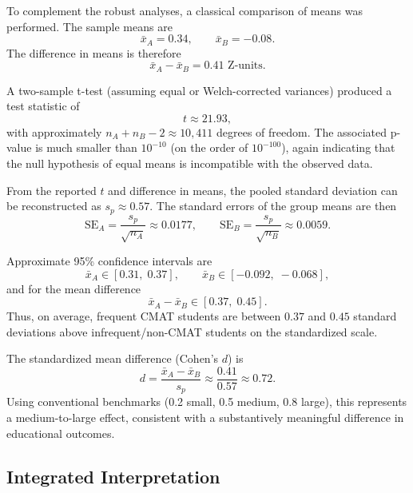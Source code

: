 \documentclass[8pt,a4paper]{article} %
\numberwithin{figure}{subsection}
\begin{document}
To complement the robust analyses, a classical comparison of means
was performed. The sample means are
\[
\bar{x}_A = 0.34, \qquad \bar{x}_B = -0.08.
\]
The difference in means is therefore
\[
\bar{x}_A - \bar{x}_B = 0.41 \text{ Z-units}.
\]

A two-sample t-test (assuming equal or Welch-corrected variances)
produced a test statistic of
\[
t \approx 21.93,
\]
with approximately $n_A + n_B - 2 \approx 10{,}411$ degrees of
freedom. The associated p-value is much smaller than $10^{-10}$ (on
the order of $10^{-100}$), again indicating that the null hypothesis
of equal means is incompatible with the observed data.

From the reported $t$ and difference in means, the pooled standard
deviation can be reconstructed as $s_p \approx 0.57$. The standard
errors of the group means are then
\[
\text{SE}_A = \frac{s_p}{\sqrt{n_A}} \approx 0.0177, \qquad
\text{SE}_B = \frac{s_p}{\sqrt{n_B}} \approx 0.0059.
\]

Approximate 95\% confidence intervals are
\[
\bar{x}_A \in [0.31,\; 0.37], \qquad
\bar{x}_B \in [-0.092,\; -0.068],
\]
and for the mean difference
\[
\bar{x}_A - \bar{x}_B \in [0.37,\; 0.45].
\]
Thus, on average, frequent CMAT students are between $0.37$ and
$0.45$ standard deviations above infrequent/non-CMAT students on
the standardized scale.

The standardized mean difference (Cohen's $d$) is
\[
d = \frac{\bar{x}_A - \bar{x}_B}{s_p} \approx \frac{0.41}{0.57}
\approx 0.72.
\]
Using conventional benchmarks (0.2 small, 0.5 medium, 0.8 large),
this represents a medium-to-large effect, consistent with a
substantively meaningful difference in educational outcomes.

\subsection{Integrated Interpretation}
\end{document}
